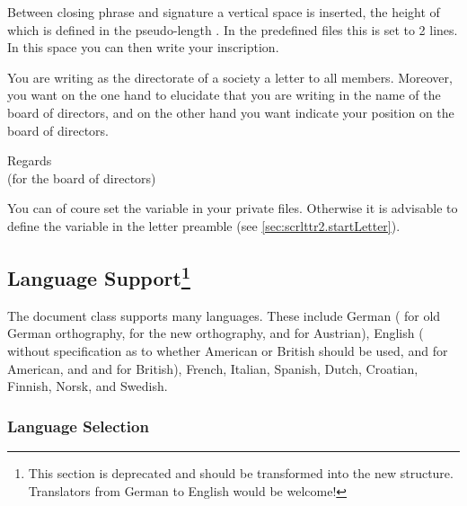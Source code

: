 Between closing phrase and signature a vertical space is inserted, the
height of which is defined in the pseudo-length
. In the predefined  files this is
set to 2 lines.  In this space you can then write your inscription.
\begin{Example}
  You are writing as the directorate of a society a letter to all
  members.  Moreover, you want on the one hand to elucidate that you
  are writing in the name of the board of directors, and on the other
  hand you want indicate your position on the board of directors.
\begin{lstcode}
  \closing{Regards\\
    (for the board of directors)}
\end{lstcode}
You can of coure set the variable  in your private
 files.  Otherwise it is advisable to define the variable in
the letter preamble (see \autoref{sec:scrlttr2.startLetter}).
\end{Example}
%
%
%


\subsection{Language Support\protect\footnote{This section is
  deprecated and should be transformed into the new structure. Translators
  from German to English would be welcome!}}
\label{sec:scrlttr2-experts.languages}
%

The document class  supports many languages.  These
include German ( for old German orthography,
 for the new orthography, and  for
Austrian), English ( without specification as to
whether American or British should be used,  and
 for American, and  and
 for British), French, Italian, Spanish, Dutch,
Croatian, Finnish, Norsk, and
Swedish.

\subsubsection{Language Selection}
\label{sec:scrlttr2-experts.switchLanguage}

